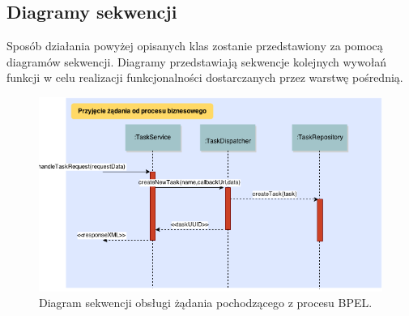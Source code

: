 \subsection{Diagramy sekwencji}

Sposób działania powyżej opisanych klas zostanie przedstawiony za pomocą diagramów sekwencji. Diagramy przedstawiają sekwencje kolejnych wywołań funkcji w celu realizacji funkcjonalności dostarczanych przez warstwę pośrednią. 

\begin{figure}[h]
\centerline{\includegraphics[scale=0.6]{createTaskFlow}}
\caption{Diagram sekwencji obsługi żądania pochodzącego z procesu BPEL.}
\label{fig:createTaskFlow}
\end{figure}

